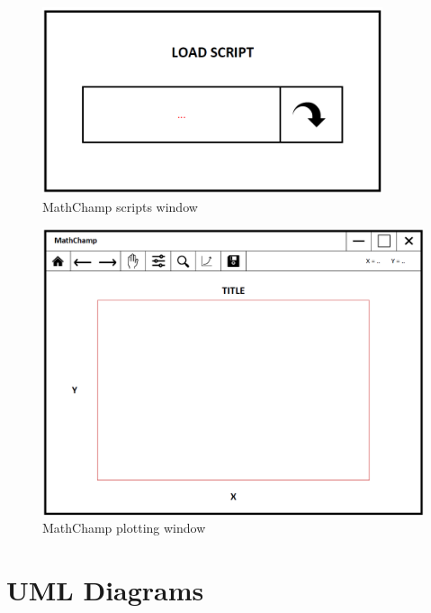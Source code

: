 \documentclass[a4paper, oneside, 11pt]{report}
\begin{document}
\begin{figure}[h]
    \centering
    \includegraphics[width=10cm]{MediumFiScript.png}
    \caption{MathChamp scripts window}
    \label{fig:MediumFi-Scripts}
\end{figure}

\begin{figure}[H]
    \centering
    \includegraphics[width=15cm]{MediumFiPlot.png}
    \caption{MathChamp plotting window}
    \label{fig:MediumFi-Plotting}
\end{figure}

\newpage


\section{UML Diagrams}\label{uml-diagrams}
\end{document}

